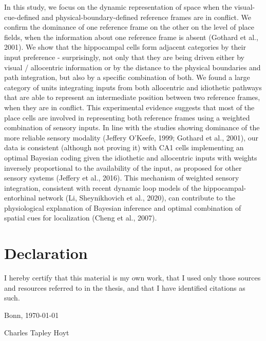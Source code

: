 \documentclass[twoside, 12pt,  footinclude=true,  headinclude=true,  cleardoublepage=empty]{scrbook}
\begin{document}
In this study, we focus on the dynamic representation of space when the visual-cue-defined and physical-boundary-defined reference frames are in conflict. We confirm the dominance of one reference frame on the other on the level of place fields, when the information about one reference frame is absent (Gothard et al., 2001). We show that the hippocampal cells form adjacent categories by their input preference - surprisingly, not only that they are being driven either by visual / allocentric information or by the distance to the physical boundaries and path integration, but also by a specific combination of both. We found a large category of units integrating inputs from both allocentric and idiothetic pathways that are able to represent an intermediate position between two reference frames, when they are in conflict. This experimental evidence suggests that most of the place cells are involved in representing both reference frames using a weighted combination of sensory inputs. In line with the studies showing dominance of the more reliable sensory modality (Jeffery O’Keefe, 1999; Gothard et al., 2001), our data is consistent (although not proving it) with CA1 cells implementing an optimal Bayesian coding given the idiothetic and allocentric inputs with weights inversely proportional to the availability of the input, as proposed for other sensory systems (Jeffery et al., 2016). This mechanism of weighted sensory integration, consistent with recent dynamic loop models of the hippocampal-entorhinal network (Li, Sheynikhovich et al., 2020), can contribute to the physiological explanation of Bayesian inference and optimal combination of spatial cues for localization  (Cheng et al., 2007).


\mainmatter













\printbibliography

\backmatter

\chapter*{Declaration}
I hereby certify that this material is my own work, that I used only those sources and resources referred to in the thesis, and that I have identified citations as such.

\vspace{0.3in}

\noindent Bonn, \today

\vspace{1in}

\noindent Charles Tapley Hoyt
\end{document}
